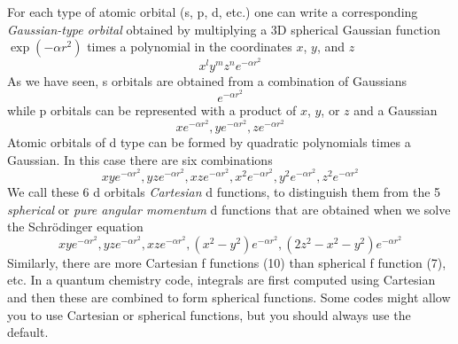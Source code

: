\documentclass[../Main/notes.tex]{subfiles}
\begin{document}
For each type of atomic orbital (s, p, d, etc.) one can write a corresponding \emph{Gaussian-type orbital} obtained by multiplying a 3D spherical Gaussian function $\exp(-\alpha r^2)$ times a polynomial in the coordinates $x$, $y$, and $z$
\begin{equation}
\label{eq:primitive}
x^l y^m z^n e^{-\alpha r^2}
\end{equation}
As we have seen, s orbitals are obtained from a combination of Gaussians
\begin{equation}
e^{-\alpha r^2}
\end{equation}
while p orbitals can be represented with a product of $x$, $y$, or $z$ and a Gaussian
\begin{equation}
x e^{-\alpha r^2}, y e^{-\alpha r^2}, z e^{-\alpha r^2}
\end{equation}
Atomic orbitals of d type can be formed by quadratic polynomials times a Gaussian.
In this case there are six combinations
\begin{equation}
xy e^{-\alpha r^2}, yz e^{-\alpha r^2}, xz e^{-\alpha r^2},
x^2 e^{-\alpha r^2}, y^2 e^{-\alpha r^2}, z^2 e^{-\alpha r^2}
\end{equation}
We call these 6 d orbitals \emph{Cartesian} d functions, to distinguish them from the 5 \emph{spherical} or \emph{pure angular momentum} d functions that are obtained when we solve the Schr\"{o}dinger equation
\begin{equation}
xy e^{-\alpha r^2}, yz e^{-\alpha r^2}, xz e^{-\alpha r^2},
(x^2 - y^2) e^{-\alpha r^2},  (2 z^2 - x^2 - y^2)e^{-\alpha r^2}
\end{equation}
Similarly, there are more Cartesian f functions (10) than spherical f function (7), etc.
In a quantum chemistry code, integrals are first computed using Cartesian and then these are combined to form spherical functions.
Some codes might allow you to use Cartesian or spherical functions, but you should always use the default.

\end{document}
